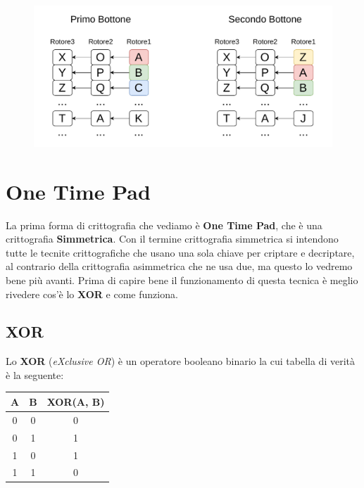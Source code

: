 \documentclass{rapport}
\begin{document}
\begin{figure}[h]
    \centering
    \includegraphics[width=\linewidth]{logos/2_8cripto.pdf}
\end{figure}

























\section{One Time Pad}
La prima forma di crittografia che vediamo è \textbf{One Time Pad}, che è una crittografia \textbf{Simmetrica}. Con il termine crittografia simmetrica si intendono tutte le tecnite crittografiche che usano una sola chiave per criptare e decriptare, al contrario della crittografia asimmetrica che ne usa due, ma questo lo vedremo bene più avanti. Prima di capire bene il funzionamento di questa tecnica è meglio rivedere cos'è lo \textbf{XOR} e come funziona.


\subsection{XOR}
Lo \textbf{XOR} (\textit{eXclusive OR}) è un operatore booleano binario la cui tabella di verità è la seguente:

\begin{center}
\begin{table}[h]
\centering
\begin{tabular}{c|c|c}
A & B & XOR(A, B) \\
\hline
0 & 0 & 0         \\
0 & 1 & 1         \\
1 & 0 & 1         \\
1 & 1 & 0         \\
\end{tabular}
\end{table}
\end{center}
\end{document}
